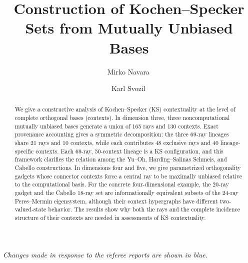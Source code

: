 \documentclass[%
  reprint,
  superscriptaddress,
  showpacs,
  showkeys,
  amsmath,amssymb,
  pra,
  longbibliography,
  floatfix,
  x11names
]{revtex4-2}
\newcommand{\rev}[1]{{\color{revisionblue}#1}}
\begin{document}
\title{Construction of Kochen--Specker Sets from Mutually Unbiased Bases}

\author{Mirko Navara\,}


\author{Karl Svozil\,}


\begin{abstract}
\rev{We give a constructive analysis of Kochen--Specker (KS) contextuality at the level of complete orthogonal bases (contexts). In dimension three, three noncomputational mutually unbiased bases generate a union of 165 rays and 130 contexts. Exact provenance accounting gives a symmetric decomposition: the three 69-ray lineages share 21 rays and 10 contexts, while each contributes 48 exclusive rays and 40 lineage-specific contexts. Each 69-ray, 50-context lineage is a KS configuration, and this framework clarifies the relation among the Yu--Oh, Harding--Salinas Schmeis, and Cabello constructions. In dimensions four and five, we give parametrized orthogonality gadgets whose connector contexts force a central ray to be maximally unbiased relative to the computational basis. For the concrete four-dimensional example, the 20-ray gadget and the Cabello 18-ray set are informationally equivalent subsets of the 24-ray Peres--Mermin eigensystem, although their context hypergraphs have different two-valued-state behavior. The results show why both the rays and the complete incidence structure of their contexts are needed in assessments of KS contextuality.}
\end{abstract}


\maketitle

\rev{\noindent\textit{Changes made in response to the referee reports are shown in blue.}}
\end{document}

